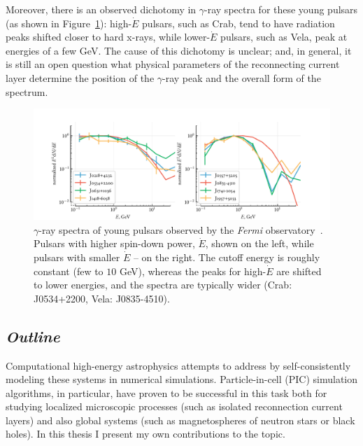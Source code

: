 Moreover, there is an observed dichotomy in $\gamma$-ray spectra for these young pulsars (as shown in Figure~\ref{fig:intro-psrspectra}): high-$\dot{E}$ pulsars, such as Crab, tend to have radiation peaks shifted closer to hard x-rays, while lower-$\dot{E}$ pulsars, such as Vela, peak at energies of a few GeV. The cause of this dichotomy is unclear; and, in general, it is still an open question what physical parameters of the reconnecting current layer determine the position of the $\gamma$-ray peak and the overall form of the spectrum.

\begin{figure}[htb]
    \centering
    \includegraphics[width=1\textwidth]{figures/intro/highlow_edot.pdf}
    \caption{$\gamma$-ray spectra of young pulsars observed by the \emph{Fermi} observatory~\citep{2013ApJS..208...17A}. Pulsars with higher spin-down power, $\dot{E}$, shown on the left, while pulsars with smaller $\dot{E}$ -- on the right. The cutoff energy is roughly constant (few to $10$ GeV), whereas the peaks for high-$\dot{E}$ are shifted to lower energies, and the spectra are typically wider (Crab: J0534+2200, Vela: J0835-4510).}
    \label{fig:intro-psrspectra}
\end{figure}

\subsection*{\small \it Outline}

Computational high-energy astrophysics attempts to address  by self-consistently modeling these systems in numerical simulations. Particle-in-cell (PIC) simulation algorithms, in particular, have proven to be successful in this task both for studying localized microscopic processes (such as isolated reconnection current layers) and also global systems (such as magnetospheres of neutron stars or black holes). In this thesis I present my own contributions to the topic. 

